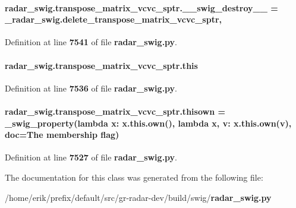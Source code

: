 \paragraph[{\+\_\+\+\_\+swig\+\_\+destroy\+\_\+\+\_\+}]{\setlength{\rightskip}{0pt plus 5cm}radar\+\_\+swig.\+transpose\+\_\+matrix\+\_\+vcvc\+\_\+sptr.\+\_\+\+\_\+swig\+\_\+destroy\+\_\+\+\_\+ = \+\_\+radar\+\_\+swig.\+delete\+\_\+transpose\+\_\+matrix\+\_\+vcvc\+\_\+sptr\hspace{0.3cm}{\ttfamily [static]}, {\ttfamily [private]}}\label{classradar__swig_1_1transpose__matrix__vcvc__sptr_a4c677523810e4555f26a1c294ccb0462}


Definition at line {\bf 7541} of file {\bf radar\+\_\+swig.\+py}.

\paragraph[{this}]{\setlength{\rightskip}{0pt plus 5cm}radar\+\_\+swig.\+transpose\+\_\+matrix\+\_\+vcvc\+\_\+sptr.\+this}\label{classradar__swig_1_1transpose__matrix__vcvc__sptr_ade3fb1da4fa100ddfc45750e978e9bdf}


Definition at line {\bf 7536} of file {\bf radar\+\_\+swig.\+py}.

\paragraph[{thisown}]{\setlength{\rightskip}{0pt plus 5cm}radar\+\_\+swig.\+transpose\+\_\+matrix\+\_\+vcvc\+\_\+sptr.\+thisown = {\bf \+\_\+swig\+\_\+property}(lambda x\+: x.\+this.\+own(), lambda {\bf x}, v\+: x.\+this.\+own(v), doc=\textquotesingle{}The membership flag\textquotesingle{})\hspace{0.3cm}{\ttfamily [static]}}\label{classradar__swig_1_1transpose__matrix__vcvc__sptr_ac75fbc96d0b4d4862a6456865de966d6}


Definition at line {\bf 7527} of file {\bf radar\+\_\+swig.\+py}.



The documentation for this class was generated from the following file\+:\begin{DoxyCompactItemize}
\item 
/home/erik/prefix/default/src/gr-\/radar-\/dev/build/swig/{\bf radar\+\_\+swig.\+py}\end{DoxyCompactItemize}
